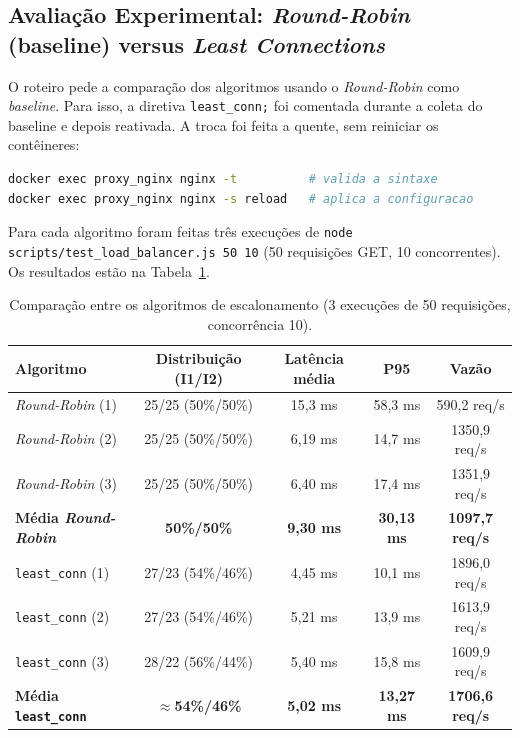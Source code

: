\documentclass[12pt,a4paper]{article}
\begin{document}
\subsection{Avaliação Experimental: \textit{Round-Robin} (baseline) versus \textit{Least Connections}}
O roteiro pede a comparação dos algoritmos usando o \textit{Round-Robin} como \textit{baseline}. Para isso, a diretiva \texttt{least\_conn;} foi comentada durante a coleta do baseline e depois reativada. A troca foi feita a quente, sem reiniciar os contêineres:
\begin{lstlisting}[language=bash]
docker exec proxy_nginx nginx -t          # valida a sintaxe
docker exec proxy_nginx nginx -s reload   # aplica a configuracao
\end{lstlisting}

Para cada algoritmo foram feitas três execuções de \texttt{node scripts/test\_load\_balancer.js 50 10} (50 requisições GET, 10 concorrentes). Os resultados estão na Tabela~\ref{tab:escalonamentos}.

\begin{table}[h!]
\centering
\caption{Comparação entre os algoritmos de escalonamento (3 execuções de 50 requisições, concorrência 10).}
\label{tab:escalonamentos}
\begin{tabular}{lcccc}
\toprule
Algoritmo & Distribuição (I1/I2) & Latência média & P95 & Vazão \\
\midrule
\textit{Round-Robin} (1) & 25/25 (50\%/50\%) & 15,3 ms & 58,3 ms & 590,2 req/s \\
\textit{Round-Robin} (2) & 25/25 (50\%/50\%) & 6,19 ms & 14,7 ms & 1350,9 req/s \\
\textit{Round-Robin} (3) & 25/25 (50\%/50\%) & 6,40 ms & 17,4 ms & 1351,9 req/s \\
\textbf{Média \textit{Round-Robin}} & \textbf{50\%/50\%} & \textbf{9,30 ms} & \textbf{30,13 ms} & \textbf{1097,7 req/s} \\
\texttt{least\_conn} (1) & 27/23 (54\%/46\%) & 4,45 ms & 10,1 ms & 1896,0 req/s \\
\texttt{least\_conn} (2) & 27/23 (54\%/46\%) & 5,21 ms & 13,9 ms & 1613,9 req/s \\
\texttt{least\_conn} (3) & 28/22 (56\%/44\%) & 5,40 ms & 15,8 ms & 1609,9 req/s \\
\textbf{Média \texttt{least\_conn}} & \textbf{$\approx$54\%/46\%} & \textbf{5,02 ms} & \textbf{13,27 ms} & \textbf{1706,6 req/s} \\
\bottomrule
\end{tabular}
\end{table}
\end{document}
